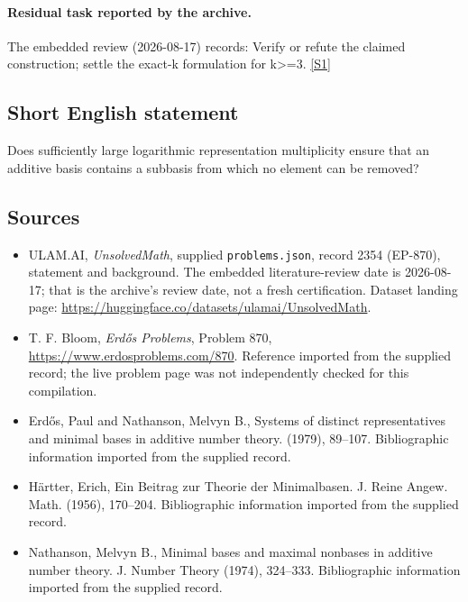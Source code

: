 \documentclass[11pt,a4paper]{article}
\newcommand{\sref}[2]{\hyperlink{source:#1:#2}{[S#2]}}
\begin{document}
\paragraph{Residual task reported by the archive.}

The embedded review (2026-08-17) records: Verify or refute the claimed construction; settle the exact-k formulation for k>=3. \sref{2354}{1}

\subsection{Short English statement}

Does sufficiently large logarithmic representation multiplicity ensure that an additive basis contains a subbasis from which no element can be removed?

\subsection{Sources}

{\small

\begin{itemize}

\item[\hypertarget{source:2354:1}{S1}] ULAM.AI, \emph{UnsolvedMath}, supplied \texttt{problems.json}, record 2354 (EP-870), statement and background. The embedded literature-review date is 2026-08-17; that is the archive’s review date, not a fresh certification. Dataset landing page: \url{https://huggingface.co/datasets/ulamai/UnsolvedMath}.

\item[\hypertarget{source:2354:2}{S2}] T. F. Bloom, \emph{Erdős Problems}, Problem 870, \url{https://www.erdosproblems.com/870}. Reference imported from the supplied record; the live problem page was not independently checked for this compilation.

\item[\hypertarget{source:2354:3}{S3}] Erd\H{o}s, Paul and Nathanson, Melvyn B., Systems of distinct representatives and minimal bases in additive number theory. (1979), 89--107. Bibliographic information imported from the supplied record.

\item[\hypertarget{source:2354:4}{S4}] H\"{a}rtter, Erich, Ein Beitrag zur {T}heorie der {M}inimalbasen. J. Reine Angew. Math. (1956), 170--204. Bibliographic information imported from the supplied record.

\item[\hypertarget{source:2354:5}{S5}] Nathanson, Melvyn B., Minimal bases and maximal nonbases in additive number theory. J. Number Theory (1974), 324--333. Bibliographic information imported from the supplied record.

\end{itemize}

}

\label{end:2354}
\end{document}
